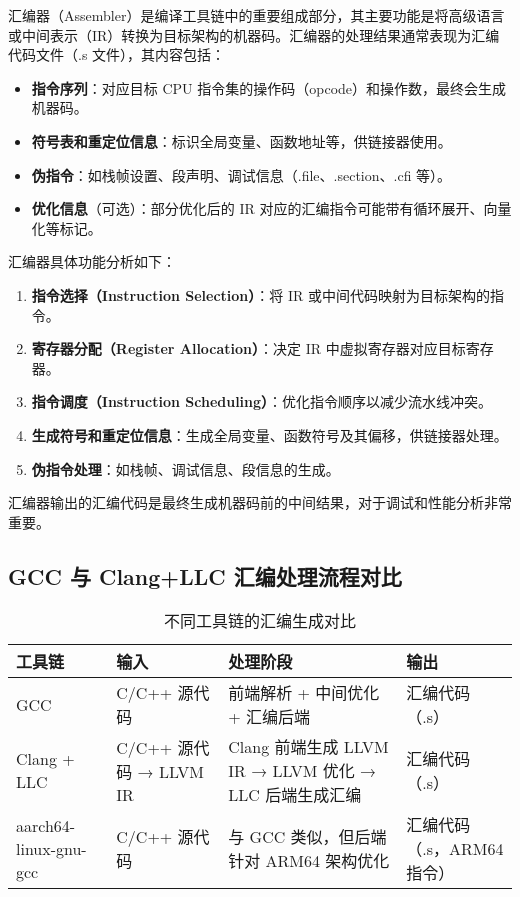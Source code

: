 \documentclass[UTF8,a4paper,10pt]{ctexart}
\begin{document}
汇编器（Assembler）是编译工具链中的重要组成部分，其主要功能是将高级语言或中间表示（IR）转换为目标架构的机器码。汇编器的处理结果通常表现为汇编代码文件（.s 文件），其内容包括：

\begin{itemize}
    \item \textbf{指令序列}：对应目标 CPU 指令集的操作码（opcode）和操作数，最终会生成机器码。
    \item \textbf{符号表和重定位信息}：标识全局变量、函数地址等，供链接器使用。
    \item \textbf{伪指令}：如栈帧设置、段声明、调试信息（.file、.section、.cfi 等）。
    \item \textbf{优化信息}（可选）：部分优化后的 IR 对应的汇编指令可能带有循环展开、向量化等标记。
\end{itemize}

汇编器具体功能分析如下：

\begin{enumerate}
    \item \textbf{指令选择（Instruction Selection）}：将 IR 或中间代码映射为目标架构的指令。
    \item \textbf{寄存器分配（Register Allocation）}：决定 IR 中虚拟寄存器对应目标寄存器。
    \item \textbf{指令调度（Instruction Scheduling）}：优化指令顺序以减少流水线冲突。
    \item \textbf{生成符号和重定位信息}：生成全局变量、函数符号及其偏移，供链接器处理。
    \item \textbf{伪指令处理}：如栈帧、调试信息、段信息的生成。
\end{enumerate}

汇编器输出的汇编代码是最终生成机器码前的中间结果，对于调试和性能分析非常重要。

\subsection{GCC 与 Clang+LLC 汇编处理流程对比}

\begin{table}[h!]
\centering
\begin{tabularx}{\textwidth}{|>{\centering\arraybackslash}X|>{\centering\arraybackslash}X|>{\centering\arraybackslash}X|>{\centering\arraybackslash}X|}
\hline
工具链 & 输入 & 处理阶段 & 输出 \\
\hline
GCC & C/C++ 源代码 & 前端解析 + 中间优化 + 汇编后端 & 汇编代码（.s） \\
\hline
Clang + LLC & C/C++ 源代码 → LLVM IR & Clang 前端生成 LLVM IR → LLVM 优化 → LLC 后端生成汇编 & 汇编代码（.s） \\
\hline
aarch64-linux-gnu-gcc & C/C++ 源代码 & 与 GCC 类似，但后端针对 ARM64 架构优化 & 汇编代码（.s，ARM64 指令） \\
\hline
\end{tabularx}
\caption{不同工具链的汇编生成对比}
\end{table}
\end{document}
